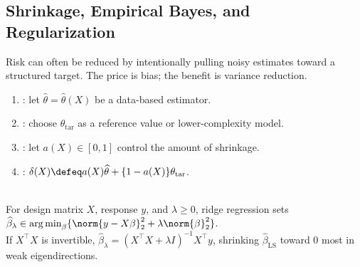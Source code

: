 \subsection{Shrinkage, Empirical Bayes, and Regularization}

Risk can often be reduced by intentionally pulling noisy estimates toward a structured target.  The price is bias; the benefit is variance reduction.

\begin{definition} \label{def:shrinkage-estimator} 
\begin{enumerate}[label=(\roman*)]
\setlength{\itemsep}{0pt}
\item {}: let $\widehat{\theta}=\widehat{\theta}(X)$ be a data-based estimator.
\item {}: choose $\theta_{\mathrm{tar}}$ as a reference value or lower-complexity model.
\item {}: let $a(X)\in[0,1]$ control the amount of shrinkage.
\item {}: $\delta(X)\defeq a(X)\widehat{\theta}+\{1-a(X)\}\theta_{\mathrm{tar}}$.
\end{enumerate}
\end{definition}

\begin{example} \label{ex:ridge-as-shrinkage} \\
For design matrix $X$, response $y$, and $\lambda\geq0$, ridge regression sets $\widehat{\beta}_\lambda\in\operatorname*{arg\,min}_\beta\{\norm{y-X\beta}_2^2+\lambda\norm{\beta}_2^2\}$.\\
If $X^\top X$ is invertible, $\widehat{\beta}_\lambda=(X^\top X+\lambda I)^{-1}X^\top y$, shrinking $\widehat{\beta}_{\mathrm{LS}}$ toward $0$ most in weak eigendirections.
\end{example}

